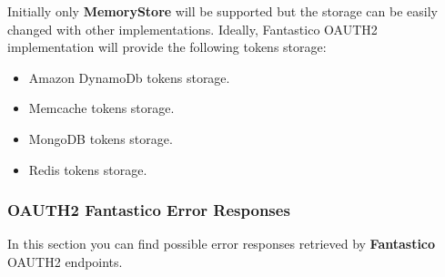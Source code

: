\documentclass[letterpaper,10pt,english]{sphinxmanual}
\begin{document}
Initially only \textbf{MemoryStore} will be supported but the storage can be easily changed with other implementations. Ideally,
Fantastico OAUTH2 implementation will provide the following tokens storage:
\begin{itemize}
\item {} 
Amazon DynamoDb tokens storage.

\item {} 
Memcache tokens storage.

\item {} 
MongoDB tokens storage.

\item {} 
Redis tokens storage.

\end{itemize}


\subsubsection{OAUTH2 Fantastico Error Responses}
\label{features/oauth2/error_responses::doc}\label{features/oauth2/error_responses:oauth2-fantastico-error-responses}
In this section you can find possible error responses retrieved by \textbf{Fantastico} OAUTH2 endpoints.
\end{document}
